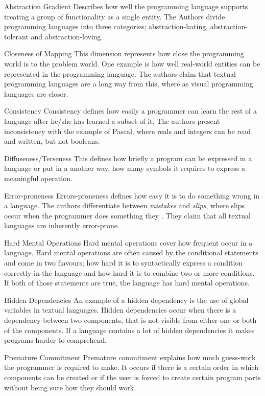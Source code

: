 \begin{labeling}{\quad\quad\quad}
\item[Abstraction Gradient] Describes how well the programming language supports treating a group of functionality as a single entity. The Authors divide programming languages into three categories; abstraction-hating, abstraction-tolerant and abstraction-loving.
\item[Closeness of Mapping] This dimension represents how close the programming world is to the problem world. One example is how well real-world entities can be represented in the programming language. The authors claim that textual programming languages are a long way from this, where as visual programming languages are closer.
\item[Consistency] Consistency defines how easily a programmer can learn the rest of a language after he/she has learned a subset of it. The authors present inconsistency with the example of Pascal, where reals and integers can be read and written, but not booleans.
\item[Diffuseness/Terseness] This defines how briefly a program can be expressed in a language or put in a another way, how many symbols it requires to express a meaningful operation.
\item[Error-proneness] Errors-proneness defines how easy it is to do something wrong in a language. The authors differentiate between \textit{mistakes} and \textit{slips}, where slips occur when the programmer does something they \textit{}. They claim that all textual languages are inherently error-prone.
\item[Hard Mental Operations] Hard mental operations cover how frequent  occur in a language. Hard mental operations are often caused by the conditional statements and come in two flavours; how hard it is to syntactically express a condition correctly in the language and how hard it is to combine two or more conditions. If both of those statements are true, the language has hard mental operations.
\item[Hidden Dependencies] An example of a hidden dependency is the use of global variables in textual languages. Hidden dependencies occur when there is a dependency between two components, that is not visible from either one or both of the components. If a language contains a lot of hidden dependencies it makes programs harder to comprehend.
\item[Premature Commitment] Premature commitment explains how much guess-work the programmer is required to make. It occurs if there is a certain order in which components can be created or if the user is forced to create certain program parts without being sure how they should work.

\end{labeling}
